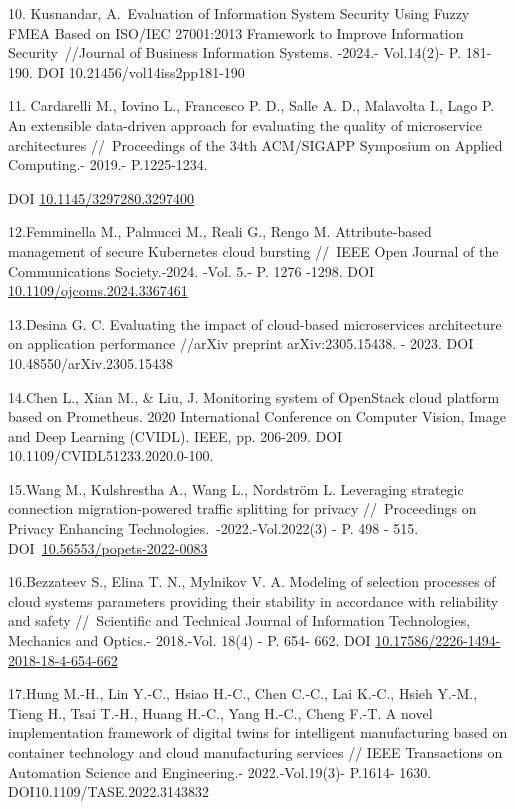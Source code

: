 \begin{references}
10. Kusnandar, A.~Evaluation of Information System Security Using Fuzzy
FMEA Based on ISO/IEC 27001:2013 Framework to Improve Information
Security~//Journal of Business Information Systems. -2024.- Vol.14(2)-
P. 181- 190. DOI 10.21456/vol14iss2pp181-190

11. Cardarelli M., Iovino L., Francesco P. D., Salle A. D., Malavolta
I., Lago P. An extensible data-driven approach for evaluating the
quality of microservice architectures //~Proceedings of the 34th
ACM/SIGAPP Symposium on Applied Computing.- 2019.- P.1225-1234.

DOI
\href{https://doi.org/10.1145/3297280.3297400}{10.1145/3297280.3297400}

12.Femminella M., Palmucci M., Reali G., Rengo M. Attribute-based
management of secure Kubernetes cloud bursting //~IEEE Open Journal of
the Communications Society.-2024. -Vol. 5.- P. 1276 -1298. DOI
\href{https://doi.org/10.1109/ojcoms.2024.3367461}{10.1109/ojcoms.2024.3367461}

13.Desina G. C. Evaluating the impact of cloud-based microservices
architecture on application performance //arXiv preprint
arXiv:2305.15438. - 2023. DOI 10.48550/arXiv.2305.15438

14.Chen L., Xian M., \& Liu, J. Monitoring system of OpenStack cloud
platform based on Prometheus. 2020 International Conference on Computer
Vision, Image and Deep Learning (CVIDL). IEEE, pp. 206-209. DOI
10.1109/CVIDL51233.2020.0-100.

15.Wang M., Kulshrestha A., Wang L., Nordström L. Leveraging strategic
connection migration-powered traffic splitting for privacy
//~Proceedings on Privacy Enhancing Technologies.~-2022.-Vol.2022(3) -
P. 498 - 515.
DOI~\href{https://doi.org/10.56553/popets-2022-0083}{10.56553/popets-2022-0083}

16.Bezzateev S., Elina T. N., Mylnikov V. A. Modeling of selection
processes of cloud systems parameters providing their stability in
accordance with reliability and safety //~Scientific and Technical
Journal of Information Technologies, Mechanics and Optics.- 2018.-Vol.
18(4) - P. 654- 662. DOI
\href{https://doi.org/10.17586/2226-1494-2018-18-4-654-662}{10.17586/2226-1494-2018-18-4-654-662}

17.Hung M.-H., Lin Y.-C., Hsiao H.-C., Chen C.-C., Lai K.-C., Hsieh
Y.-M., Tieng H., Tsai T.-H., Huang H.-C., Yang H.-C., Cheng F.-T. A
novel implementation framework of digital twins for intelligent
manufacturing based on container technology and cloud manufacturing
services // IEEE Transactions on Automation Science and Engineering.-
2022.-Vol.19(3)- P.1614- 1630. DOI10.1109/TASE.2022.3143832


\end{references}
